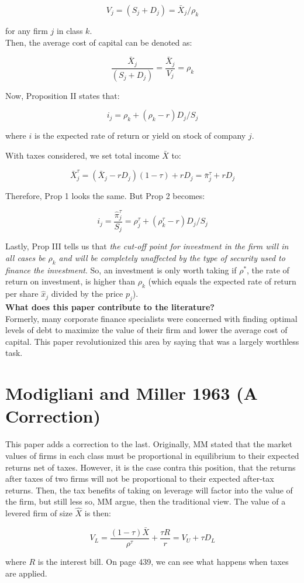 \documentclass[10pt,a4paper]{article}
\begin{document}
$$V_j = (S_j + D_j) = \bar{X}_j / \rho_k$$

for any firm $j$ in class $k$. \\

\noindent Then, the average cost of capital can be denoted as:

$$\frac{\bar{X}_j}{(S_j + D_j)} = \frac{\bar{X}_j}{V_j} = \rho_k$$


\noindent Now, Proposition II states that:

$$i_j = \rho_k + (\rho_k - r)D_j/S_j$$

where $i$ is the expected rate of return or yield on stock of company $j$. 

\noindent With taxes considered, we set total income $\bar{X}$ to:

$$\bar{X}_j^{\tau} = (\bar{X}_j - rD_j)(1 - \tau) + rD_j = \bar{\pi}_j^{\tau} + rD_j$$

Therefore, Prop 1 looks the same. But Prop 2 becomes:

$$i_j = \frac{\hat{\pi}_j^{\tau}}{S_j} = \rho_j^{\tau} + (\rho_k^{\tau} - r)D_j/S_j $$ 

\noindent Lastly, Prop III tells us that \textit{the cut-off point for investment in the firm will in all cases be $\rho_k$ and will be completely unaffected by the type of security used to finance the investment}. So, an investment is only worth taking if $\rho^*$, the rate of return on investment, is higher than $\rho_k$ (which equals the expected rate of return per share $\hat{x}_j$ divided by the price $p_j$). \\




\noindent \textbf{What does this paper contribute to the literature?} \\

Formerly, many corporate finance specialists were concerned with finding optimal levels of debt to maximize the value of their firm and lower the average cost of capital. This paper revolutionized this area by saying that was a largely worthless task. 





\section{Modigliani and Miller 1963 (A Correction)}

This paper adds a correction to the last. Originally, MM stated that the market values of firms in each class must be proportional in equilibrium to their expected returns net of taxes. However, it is the case contra this position, that the returns after taxes of two firms will not be proportional to their expected after-tax returns. Then, the tax benefits of taking on leverage will factor into the value of the firm, but still less so, MM argue, then the traditional view. The value of a levered firm of size $\hat{X}$ is then:

$$V_L = \frac{(1-\tau)\bar{X}}{\rho^{\tau}} + \frac{\tau R}{r} = V_U + \tau D_L$$

where $R$ is the interest bill. On page 439, we can see what happens when taxes are applied. 
\end{document}

